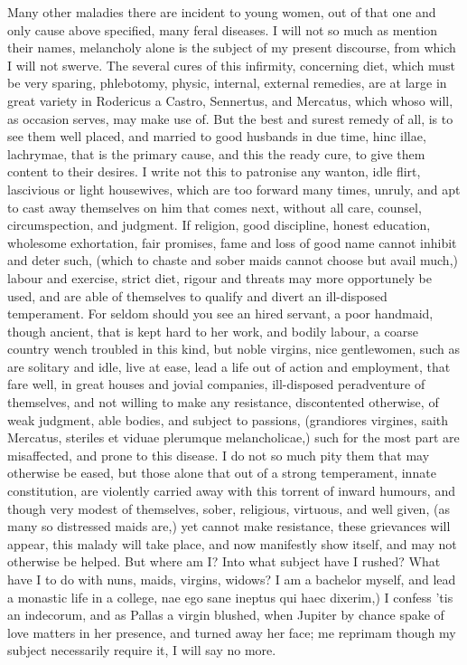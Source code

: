 {Many other maladies there are incident to young women, out of that one
and only cause above specified, many feral diseases. I will not so much
as mention their names, melancholy alone is the subject of my present
discourse, from which I will not swerve. The several cures of this
infirmity, concerning diet, which must be very sparing, phlebotomy,
physic, internal, external remedies, are at large in great variety in
 Rodericus a Castro, Sennertus, and Mercatus, which whoso will,
as occasion serves, may make use of. But the best and surest remedy of
all, is to see them well placed, and married to good husbands in due
time, hinc illae, lachrymae, that is the primary cause, and this the
ready cure, to give them content to their desires. I write not this to
patronise any wanton, idle flirt, lascivious or light housewives, which
are too forward many times, unruly, and apt to cast away themselves on
him that comes next, without all care, counsel, circumspection, and
judgment. If religion, good discipline, honest education, wholesome
exhortation, fair promises, fame and loss of good name cannot inhibit
and deter such, (which to chaste and sober maids cannot choose but
avail much,) labour and exercise, strict diet, rigour and threats may
more opportunely be used, and are able of themselves to qualify and
divert an ill-disposed temperament. For seldom should you see an hired
servant, a poor handmaid, though ancient, that is kept hard to her
work, and bodily labour, a coarse country wench troubled in this kind,
but noble virgins, nice gentlewomen, such as are solitary and idle,
live at ease, lead a life out of action and employment, that fare well,
in great houses and jovial companies, ill-disposed peradventure of
themselves, and not willing to make any resistance, discontented
otherwise, of weak judgment, able bodies, and subject to passions,
(grandiores virgines, saith Mercatus, steriles et viduae plerumque
melancholicae,) such for the most part are misaffected, and prone to
this disease. I do not so much pity them that may otherwise be eased,
but those alone that out of a strong temperament, innate constitution,
are violently carried away with this torrent of inward humours, and
though very modest of themselves, sober, religious, virtuous, and well
given, (as many so distressed maids are,) yet cannot make resistance,
these grievances will appear, this malady will take place, and now
manifestly show itself, and may not otherwise be helped. But where am
I? Into what subject have I rushed? What have I to do with nuns, maids,
virgins, widows? I am a bachelor myself, and lead a monastic life in a
college, nae ego sane ineptus qui haec dixerim,) I confess 'tis an
indecorum, and as Pallas a virgin blushed, when Jupiter by chance spake
of love matters in her presence, and turned away her face; me reprimam
though my subject necessarily require it, I will say no more.

}
